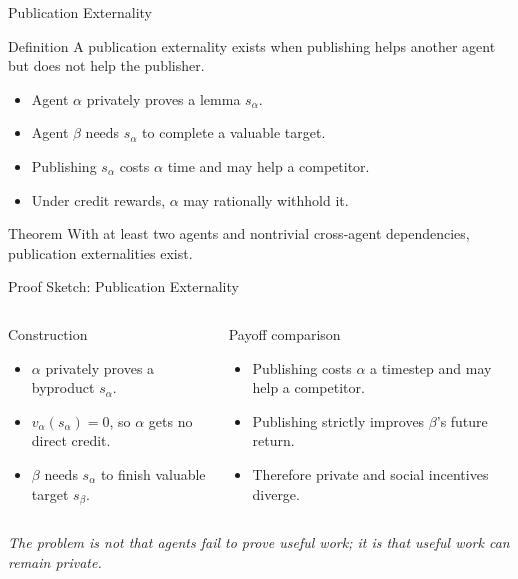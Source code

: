 \documentclass[10pt,aspectratio=169]{beamer}
\begin{document}
\begin{frame}{Publication Externality}
\small
\begin{block}{Definition}
A publication externality exists when publishing helps another agent but does not help the publisher.
\end{block}

\begin{itemize}
  \item Agent $\alpha$ privately proves a lemma $s_\alpha$.
  \item Agent $\beta$ needs $s_\alpha$ to complete a valuable target.
  \item Publishing $s_\alpha$ costs $\alpha$ time and may help a competitor.
  \item Under credit rewards, $\alpha$ may rationally withhold it.
\end{itemize}

\begin{block}{Theorem}
With at least two agents and nontrivial cross-agent dependencies, publication externalities exist.
\end{block}
\end{frame}

\begin{frame}{Proof Sketch: Publication Externality}
\small
\begin{columns}[T,onlytextwidth]
\begin{block}{Construction}
\begin{itemize}
  \item $\alpha$ privately proves a byproduct $s_\alpha$.
  \item $v_\alpha(s_\alpha)=0$, so $\alpha$ gets no direct credit.
  \item $\beta$ needs $s_\alpha$ to finish valuable target $s_\beta$.
\end{itemize}
\end{block}
\begin{block}{Payoff comparison}
\begin{itemize}
  \item Publishing costs $\alpha$ a timestep and may help a competitor.
  \item Publishing strictly improves $\beta$'s future return.
  \item Therefore private and social incentives diverge.
\end{itemize}
\end{block}
\end{columns}

\vspace{0.6em}
\centering
\textit{The problem is not that agents fail to prove useful work; it is that useful work can remain private.}
\end{frame}
\end{document}
